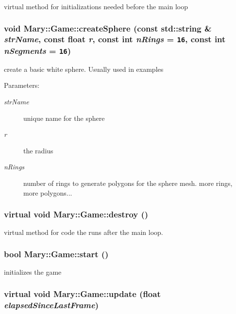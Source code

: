 virtual method for initializations needed before the main loop \hypertarget{class_mary_1_1_game_03483c4d1fd0df06c063691978387353}{
\subsubsection[createSphere]{\setlength{\rightskip}{0pt plus 5cm}void Mary::Game::createSphere (const std::string \& {\em strName}, \/  const float {\em r}, \/  const int {\em nRings} = {\tt 16}, \/  const int {\em nSegments} = {\tt 16})}}
\label{class_mary_1_1_game_03483c4d1fd0df06c063691978387353}


create a basic white sphere. Usually used in examples \begin{Desc}
\item[Parameters:]
\begin{description}
\item[{\em strName}]unique name for the sphere \item[{\em r}]the radius \item[{\em nRings}]number of rings to generate polygons for the sphere mesh. more rings, more polygons... \end{description}
\end{Desc}
\hypertarget{class_mary_1_1_game_7b8b8ce9b58091229320816e3241fd98}{
\subsubsection[destroy]{\setlength{\rightskip}{0pt plus 5cm}virtual void Mary::Game::destroy ()}}
\label{class_mary_1_1_game_7b8b8ce9b58091229320816e3241fd98}


virtual method for code the runs after the main loop. \hypertarget{class_mary_1_1_game_26ca832057d8e17e801d38549d703fc1}{
\subsubsection[start]{\setlength{\rightskip}{0pt plus 5cm}bool Mary::Game::start ()}}
\label{class_mary_1_1_game_26ca832057d8e17e801d38549d703fc1}


initializes the game \hypertarget{class_mary_1_1_game_9c5be30e806dd6419a5d44b398ece955}{
\subsubsection[update]{\setlength{\rightskip}{0pt plus 5cm}virtual void Mary::Game::update (float {\em elapsedSinceLastFrame})}}
\label{class_mary_1_1_game_9c5be30e806dd6419a5d44b398ece955}


